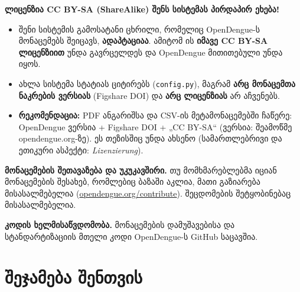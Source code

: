 \documentclass[11pt,a4paper]{article}
\newcommand{\imp}[1]{\textbf{\color{importred}#1}}
\begin{document}
\begin{alarm}
\textbf{ლიცენზია CC BY-SA (ShareAlike) შენს სისტემას პირდაპირ ეხება!}
\begin{itemize}[leftmargin=1.5em]
  \item შენი სისტემის გამოსატანი ცხრილი, რომელიც OpenDengue-ს მონაცემებს შეიცავს, \textbf{ადაპტაციაა}. ამიტომ ის
        \imp{იმავე CC BY-SA ლიცენზიით} უნდა გავრცელდეს და OpenDengue მითითებული უნდა იყოს.
  \item ახლა სისტემა სტატიას ციტირებს (\texttt{config.py}), მაგრამ \textbf{არც მონაცემთა ნაკრების ვერსიას} (Figshare DOI) და \textbf{არც
        ლიცენზიას} არ აჩვენებს.
  \item \textbf{რეკომენდაცია:} PDF ანგარიშსა და CSV-ის მეტამონაცემებში ჩაწერე: OpenDengue ვერსია + Figshare DOI + „CC BY-SA“ (ვერსია: შეამოწმე opendengue.org-ზე).
        ეს თეზისშიც უნდა ახსენო (სამართლებრივი და ეთიკური ასპექტი: \textit{Lizenzierung}).
\end{itemize}
\end{alarm}

\textbf{მონაცემების შეთავაზება და უკუკავშირი.} თუ მომხმარებლებმა იციან მონაცემების შესახებ, რომლებიც ბაზაში აკლია, მათი
გაზიარება მისასალმებელია (\href{https://opendengue.org/contribute}{opendengue.org/contribute}). შეცდომების შეტყობინებაც მისასალმებელია.

\textbf{კოდის ხელმისაწვდომობა.} მონაცემების დამუშავებისა და სტანდარტიზაციის მთელი კოდი OpenDengue-ს GitHub საცავშია.

\section{შეჯამება შენთვის}
\end{document}
